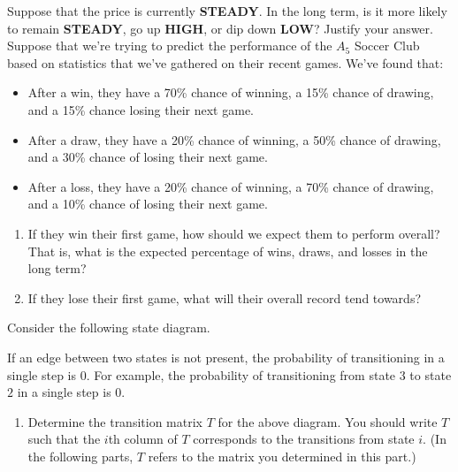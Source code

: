\begin{tasks}[resume, style=enumerate]
  Suppose that the price is currently \textbf{STEADY}.  In the long
  term, is it more likely to remain \textbf{STEADY}, go up \textbf{HIGH},
  or dip down \textbf{LOW}?  Justify your answer.
\task
  Suppose that we're trying to predict the performance of the $A_5$
  Soccer Club based on statistics that we've gathered on their recent
  games. We've found that:
  \begin{itemize}
  \item
    After a win, they have a 70\% chance of winning, a 15\% chance of
    drawing, and a 15\% chance losing their next game.
  \item
    After a draw, they have a 20\% chance of winning, a 50\% chance of
    drawing, and a 30\% chance of losing their next game.
  \item
    After a loss, they have a 20\% chance of winning, a 70\% chance of
    drawing, and a 10\% chance of losing their next game.
  \end{itemize}
  \begin{enumerate}[label=(\alph*)]
  \item
    If they win their first game, how should we expect them to
    perform overall?  That is, what is the expected percentage of
    wins, draws, and losses in the long term?
  \item
    If they lose their first game, what will their overall record tend
    towards?
  \end{enumerate}
\task
  Consider the following state diagram.
  \begin{center}
  \end{center}
  If an edge between two states is not present, the probability of
  transitioning in a single step is $0$.  For example, the probability
  of transitioning from state $3$ to state $2$ in a single step is $0$.
  \begin{enumerate}[label=(\alph*)]
  \item
    Determine the transition matrix $T$ for the above diagram. You
    should write $T$ such that the $i$th column of $T$ corresponds to
    the transitions from state $i$. (In the following parts, $T$
    refers to the matrix you determined in this part.)

\end{enumerate}
\end{tasks}
